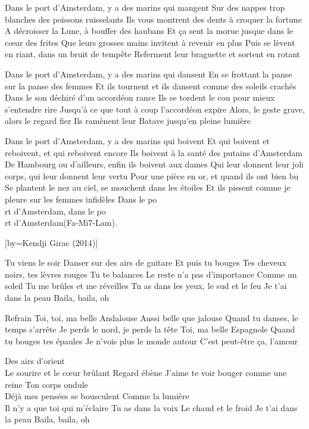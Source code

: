 \beginverse
Dans le port d'Amsterdam, y a des marins qui mangent 
Sur des nappes trop blanches des poissons ruisselants
Ils vous montrent des dents à croquer la fortune
A décroisser la Lune, à bouffer des haubans 
Et ça sent la morue jusque dans le cœur des frites 
Que leurs grosses mains invitent à revenir en plus
Puis se lèvent en riant, dans un bruit de tempête
Referment leur braguette et sortent en rotant
\endverse

\beginverse
Dans le port d'Amsterdam, y a des marins qui dansent 
En se frottant la panse sur la panse des femmes 
Et ils tournent et ils dansent comme des soleils crachés 
Dans le son déchiré d'un accordéon rance
Ils se tordent le cou pour mieux s'entendre rire
Jusqu'à ce que tout à coup l'accordéon expire
Alors, le geste grave, alors le regard fier 
Ils ramènent leur Batave jusqu'en pleine lumière
\endverse

\beginverse
Dans le port d'Amsterdam, y a des marins qui boivent 
Et qui boivent et reboivent, et qui reboivent encore
Ils boivent à la santé des putains d'Amsterdam 
De Hambourg ou d'ailleurs, enfin ils boivent aux dames
Qui leur donnent leur joli corps, qui leur donnent leur vertu
Pour une pièce en or, et quand ils ont bien bu
Se plantent le nez au ciel, se mouchent dans les étoiles 
Et ils pissent comme je pleure sur les femmes infidèles 
Dans le po\\[lam]rt d'Amsterdam, dans le po\\[Mi7]rt d'Amsterdam(Fa-Mi7-Lam).
\endverse

[by={Kendji Girac (2014)}]

\beginverse
Tu viens le soir
Danser sur des airs de guitare
Et puis tu bouges
Tes cheveux noirs, tes lèvres rouges
Tu te balances
Le reste n'a pas d'importance
Comme un soleil
Tu me brûles et me réveilles
Tu as dans les yeux, le sud et le feu
Je t'ai dans la peau
Baila, baila, oh
\endverse

\beginverse
Refrain
Toi, toi, ma belle Andalouse
Aussi belle que jalouse
Quand tu danses, le temps s'arrête
Je perds le nord, je perds la tête
Toi, ma belle Espagnole
Quand tu bouges tes épaules
Je n'vois plus le monde autour
C'est peut-être ça, l'amour
\endverse

\beginverse
Des airs d'orient \\[baila]
Le sourire et le cœur brûlant
Regard ébène
J'aime te voir bouger comme une reine
Ton corps ondule \\[baila]
Déjà mes pensées se bousculent
Comme la lumière \\[baila]
Il n'y a que toi qui m'éclaire
Tu as dans la voix
Le chaud et le froid
Je t'ai dans la peau
Baila, baila, oh
\endverse

